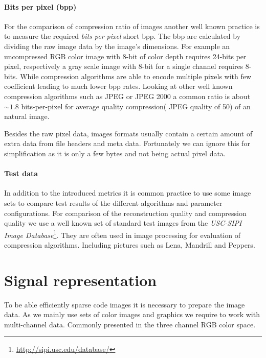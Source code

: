 \paragraph{Bits per pixel (bpp)} 
For the comparison of compression ratio of images another well known practice is
to measure the required \emph{bits per pixel} short bpp. The bbp are calculated
by dividing the raw image data by the image's dimensions. For example an
uncompressed RGB color image with 8-bit of color depth requires 24-bits per
pixel, respectively a gray scale image with 8-bit for a single channel requires
8-bits. While compression algorithms are able to encode multiple pixels with few
coefficient leading to much lower bpp rates.
Looking at other well known compression algorithms such as JPEG or
JPEG 2000 a common ratio is about $\sim1.8$ bits-per-pixel for average
quality compression( JPEG quality of 50) of an natural image. 

Besides the raw pixel data, images formats usually contain a certain amount
of extra data from file headers and meta data. Fortunately we can ignore this
for simplification as it is only a few bytes and not being actual pixel data.

\paragraph{Test data}
In addition to the introduced metrics it is common practice to use some image
sets to compare test results of the different algorithms and parameter
configurations. For comparison of the reconstruction quality and compression
quality we use a well known set of standard test images from the \emph{USC-SIPI
Image Database}\footnote{\url{http://sipi.usc.edu/database/}}. They are often
used in image processing for evaluation of compression algorithms. 
Including pictures such as Lena, Mandrill and Peppers.



\section{Signal representation}
\label{sec:signal_representation}
To be able efficiently sparse code images it is necessary to prepare the
image data. As we mainly use sets of color images and graphics we require
to work with multi-channel data. Commonly presented in the three channel RGB
color space. 



